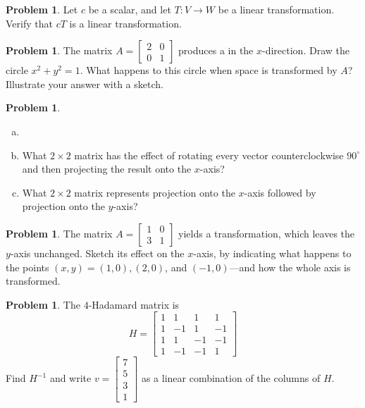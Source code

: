 \documentclass[10pt]{article}
\theoremstyle{definition}
\newtheorem{problem}[theorem]{Problem}
\newcommand{\1}[1]{\textbf{1}_{\left[#1\right]}} %
\newcommand{\dempfcolor}[1]{{\color{RoyalBlue}#1}}
\newcommand{\demph}[1]{\dempfcolor{{\sl #1}}}
\begin{document}
\begin{problem}
  Let $c$ be a scalar, and let $T:V \to W$ be a linear transformation. Verify
  that $cT$ is a linear transformation.
\end{problem}

\begin{problem}
  The matrix $A=
  \begin{bmatrix}
    2&0\\
    0&1
  \end{bmatrix}
  $ produces a \demph{stretching} in the $x$-direction. Draw the circle
  $x^{2}+y^{2}=1$. What happens to this circle when space is transformed by
  $A$? Illustrate your answer with a sketch.
\end{problem}

\begin{problem}
  \begin{enumerate}[(a)]
    \setlength{\itemsep}{0pt}
    \item[]
    \item What $2\times 2$ matrix has the effect of rotating every vector
    counterclockwise $90^{\circ}$ and then projecting the result onto the
    $x$-axis?
    \item What $2\times 2$ matrix represents projection onto the $x$-axis
    followed by projection onto the $y$-axis?
  \end{enumerate}
\end{problem}

\begin{problem}
  The matrix $A=
  \begin{bmatrix}
    1&0\\
    3&1
  \end{bmatrix}
  $ yields a \demph{shearing} transformation, which leaves the $y$-axis
  unchanged. Sketch its effect on the $x$-axis, by indicating what happens to
  the points $(x,y)= (1,0),(2,0)$, and $(-1,0)$---and how the whole axis is
  transformed.
\end{problem}











\begin{problem}
  The $4$-Hadamard matrix is
  \begin{equation*}
    H=
    \begin{bmatrix}
      1&1&1&1\\
      1&-1&1&-1\\
      1&1&-1&-1\\
      1&-1&-1&1
    \end{bmatrix}
  \end{equation*}
  Find $H^{-1}$ and write $v=
  \begin{bmatrix}
    7\\5\\3\\1
  \end{bmatrix}
  $
  as a linear combination of the columns of $H$.
\end{problem}
\end{document}
